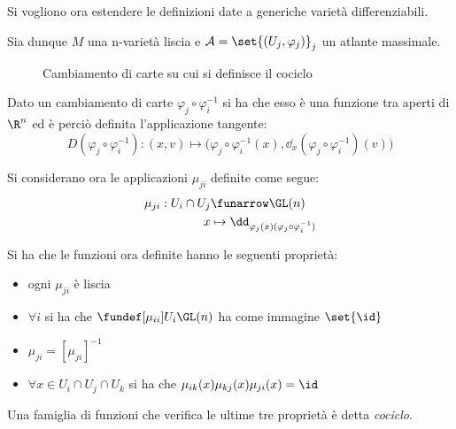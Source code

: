 
Si vogliono ora estendere le definizioni date a generiche varietà differenziabili.

Sia dunque $M$ una n-varietà liscia e $\mathcal{A} = \set{(U_j, \varphi _j)}_j$ un atlante massimale.

\begin{figure}
\centering

\caption{Cambiamento di carte su cui si definisce il cociclo}
\end{figure}

\begin{oss}
Dato un cambiamento di carte $\varphi _j \circ \varphi _i ^{-1}$ si ha che esso è una funzione tra aperti di $\R ^n$ ed è perciò definita l'applicazione tangente:
\begin{equation*}
D(\varphi _j \circ \varphi _i ^{-1}): (x,v) \mapsto \big(\varphi _j \circ \varphi _i ^{-1}(x), \dd_x(\varphi _j \circ \varphi _i ^{-1})(v)\big)
\end{equation*}
\end{oss}

Si considerano ora le applicazioni $\mu_{ji}$ definite come segue:
\begin{align*}
\mu_{ji} : U_i\cap U_j &\funarrow \GL(n) \\
x &\mapsto \dd_{\varphi_j(x)(\varphi _j \circ \varphi _i ^{-1})}
\end{align*}

\begin{oss}
Si ha che le funzioni ora definite hanno le seguenti proprietà:
\begin{itemize}
\item ogni $\mu_{ji}$ è liscia
\item $\forall i$ si ha che $\fundef[\mu_{ii}]{U_i}{\GL(n)}$ ha come immagine $\set{\id}$
\item $\mu_{ji} = [\mu_{ji}]^{-1}$ 
\item $\forall x \in U_i\cap U_j\cap U_k$ si ha che $\mu_{ik}(x)\mu_{kj}(x)\mu_{ji}(x) = \id$
\end{itemize}
Una famiglia di funzioni che verifica le ultime tre proprietà è detta \emph{cociclo}.
\end{oss}


\begin{epigraphs}	
\end{epigraphs}
